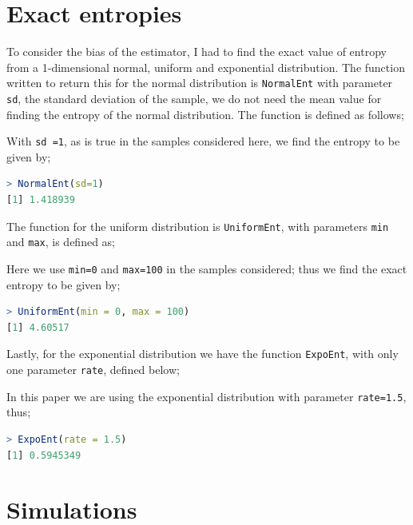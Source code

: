 \documentclass[12pt]{report}
\begin{document}
\begin{appendix}
\section{Exact entropies}

To consider the bias of the estimator, I had to find the exact value of entropy from a 1-dimensional normal, uniform and exponential distribution. The function written to return this for the normal distribution is \texttt{NormalEnt} with parameter \texttt{sd}, the standard deviation of the sample, we do not need the mean value for finding the entropy of the normal distribution. The function is defined as follows;



With \texttt{sd =1}, as is true in the samples considered here, we find the entropy to be given by;

\begin{lstlisting}[language=R]
> NormalEnt(sd=1)
[1] 1.418939
\end{lstlisting}

The function for the uniform distribution is \texttt{UniformEnt}, with parameters \texttt{min} and \texttt{max}, is defined as;



Here we use \texttt{min=0} and \texttt{max=100} in the samples considered; thus we find the exact entropy to be given by;

\begin{lstlisting}[language=R]
> UniformEnt(min = 0, max = 100)
[1] 4.60517
\end{lstlisting}

Lastly, for the exponential distribution we have the function \texttt{ExpoEnt}, with only one parameter \texttt{rate}, defined below;



In this paper we are using the exponential distribution with parameter \texttt{rate=1.5}, thus;

\begin{lstlisting}[language=R]
> ExpoEnt(rate = 1.5)
[1] 0.5945349
\end{lstlisting}



\section{Simulations}


\end{appendix}
\end{document}
